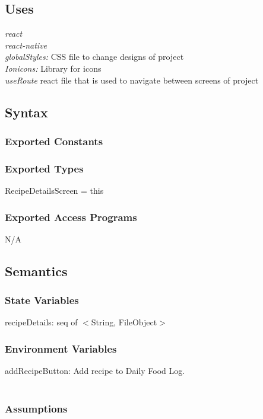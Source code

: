 \documentclass[12pt, titlepage]{article}
\begin{document}
\subsection{Uses}
{\textit{react}}\\
{\textit{react-native}}\\
{\textit{globalStyles:} CSS file to change designs of project}\\
{\textit{Ionicons:} Library for icons}\\
{\textit{useRoute} react file that is used to navigate between screens of project}\\

\subsection{Syntax}

\subsubsection{Exported Constants}

\subsubsection{Exported Types}
RecipeDetailsScreen = this

\subsubsection{Exported Access Programs}
N/A

\subsection{Semantics}

\subsubsection{State Variables}
recipeDetails: seq of $<$String, FileObject$>$\\

\subsubsection{Environment Variables}

addRecipeButton: Add recipe to Daily Food Log.\\\\

\subsubsection{Assumptions}
\end{document}

